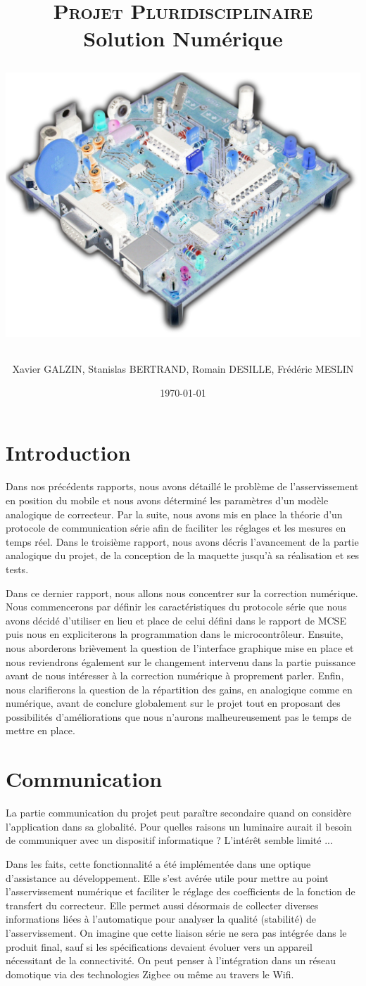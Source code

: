 \documentclass[11pt, french]{article} %
\title{\textsc{Projet Pluridisciplinaire} \\ Solution Numérique \\
\begin{minipage}[c][20cm][c]{15cm}
\includegraphics[width=15cm]{../Photos/CarteFrontInv.png}
\end{minipage}}
\author{Xavier GALZIN, Stanislas BERTRAND, Romain DESILLE, Frédéric MESLIN}
\date{\today}
\begin{document}
\maketitle

\pagebreak
\tableofcontents

\pagebreak
\section*{Introduction}

Dans nos précédents rapports, nous avons détaillé le problème de l'asservissement en position du mobile et nous avons déterminé les paramètres d'un modèle analogique de correcteur. Par la suite, nous avons mis en place la théorie d'un protocole de communication série afin de faciliter les réglages et les mesures en temps réel. Dans le troisième rapport, nous avons décris l'avancement de la partie analogique du projet, de la conception de la maquette jusqu'à sa réalisation et ses tests. 

\medskip

Dans ce dernier rapport, nous allons nous concentrer sur la correction numérique. Nous commencerons par définir les caractéristiques du protocole série que nous avons décidé d'utiliser en lieu et place de celui défini dans le rapport de MCSE puis nous en expliciterons la programmation dans le microcontrôleur. Ensuite, nous aborderons brièvement la question de l'interface graphique mise en place et nous reviendrons également sur le changement intervenu dans la partie puissance avant de nous intéresser à la correction numérique à proprement parler. Enfin, nous clarifierons la question de la répartition des gains, en analogique comme en numérique, avant de conclure globalement sur le projet tout en proposant des possibilités d'améliorations que nous n'aurons malheureusement pas le temps de mettre en place. 


\section{Communication}
	La partie communication du projet peut paraître secondaire quand on considère l'application dans sa globalité. Pour quelles raisons un luminaire aurait il besoin de communiquer avec un dispositif informatique ? L'intérêt semble limité ...

\medskip
Dans les faits, cette fonctionnalité a été implémentée dans une optique d'assistance au développement. Elle s'est avérée utile pour mettre au point l'asservissement numérique et faciliter le réglage des coefficients de la fonction de transfert du correcteur. Elle permet aussi désormais de collecter diverses informations liées à l'automatique pour analyser la qualité (stabilité) de l'asservissement. On imagine que cette liaison série ne sera pas intégrée dans le produit final, sauf si les spécifications devaient évoluer vers un appareil nécessitant de la connectivité. On peut penser à l'intégration dans un réseau domotique via des technologies Zigbee ou même au travers le Wifi.
\end{document}
